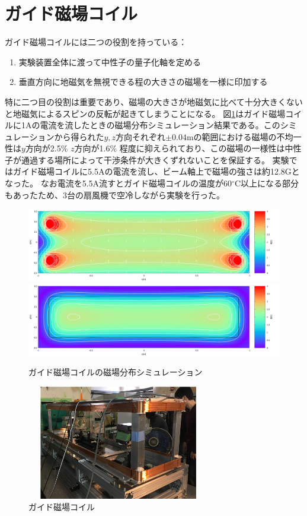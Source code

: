 \section{ガイド磁場コイル}
ガイド磁場コイルには二つの役割を持っている：
\begin{enumerate}
\item 実験装置全体に渡って中性子の量子化軸を定める
\item 垂直方向に地磁気を無視できる程の大きさの磁場を一様に印加する
\end{enumerate}

特に二つ目の役割は重要であり、磁場の大きさが地磁気に比べて十分大きくないと地磁気によるスピンの反転が起きてしまうことになる。
図\ref{device_fig_guide}はガイド磁場コイルに1Aの電流を流したときの磁場分布シミュレーション結果である。このシミュレーションから得られた$y,z$方向それぞれ$\pm0.04$mの範囲における磁場の不均一性は$y$方向が2.5\% $z$方向が1.6\% 程度に抑えられており、この磁場の一様性は中性子が通過する場所によって干渉条件が大きくずれないことを保証する。
実験ではガイド磁場コイルに5.5Aの電流を流し、ビーム軸上で磁場の強さは約12.8Gとなった。
なお電流を5.5A流すとガイド磁場コイルの温度が60$^\circ$C以上になる部分もあったため、3台の扇風機で空冷しながら実験を行った。
\begin{figure}[H]
\begin{center}
\includegraphics[width=12cm]{device/coil4_image1.pdf}
\includegraphics[width=12cm]{device/coil4_image2.pdf}
\end{center}
\caption{ガイド磁場コイルの磁場分布シミュレーション}\label{device_fig_guide}
\end{figure}
\begin{figure}[H]
\centering
\includegraphics[width=8cm,height=5cm]{device/coilphoto.pdf}\caption{ガイド磁場コイル}
\end{figure}


